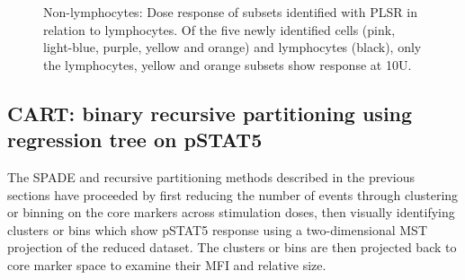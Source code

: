 \begin{figure}
\begin{minipage}{.6\textwidth}
\end{minipage}
\begin{minipage}{.3\textwidth}
{ Non-lymphocytes: Dose response of subsets identified with PLSR in relation to lymphocytes. }
{
    Of the five newly identified cells (pink, light-blue, purple, yellow and orange) and lymphocytes (black), only
    the lymphocytes, yellow and orange subsets show response at 10U.
} 
\end{minipage}
\end{figure}



\clearpage



\subsection{CART: binary recursive partitioning using regression tree on pSTAT5}

The \gls{SPADE} and recursive partitioning methods described in the previous sections have proceeded by first reducing the number of events through clustering or binning
on the core markers across stimulation doses, then visually identifying clusters or bins which show pSTAT5 response using a two-dimensional \gls{MST} projection
of the reduced dataset. The clusters or bins are then projected back to core marker space to examine their MFI and relative size.

